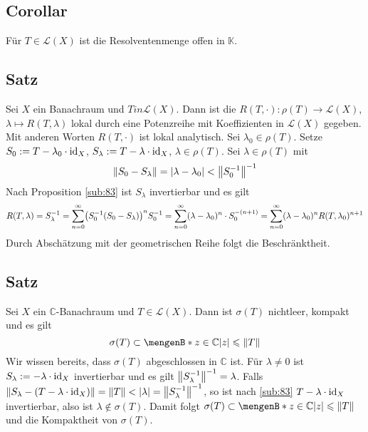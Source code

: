 \subsection{Corollar} %
\label{sub:84}
Für $T \in \mathcal{L}(X)$ ist die Resolventenmenge offen in $\mathds{K}$.

\subsection[Satz: Die Resolventenabbildung ist lokal durch eine Potenzreihe gegeben]{Satz} %
\label{sub:85}
Sei $X$ ein Banachraum und $T in \mathcal{L}(X)$. Dann ist die  $R(T,\cdot ) \colon \rho(T) \to \mathcal{L}(X)$, $\lambda \mapsto R(T,\lambda)$
lokal durch eine Potenzreihe mit Koeffizienten in $\mathcal{L}(X)$ gegeben. Mit anderen Worten $R(T,\cdot )$ ist lokal analytisch.
Sei $\lambda_0 \in \rho(T)$. Setze $S_0 := T- \lambda_0 \cdot \operatorname{id}_X$, $S_\lambda := T- \lambda \cdot \operatorname{id}_X$, $\lambda \in \rho(T)$. Sei $\lambda \in \rho(T)$ mit 
\[
	\norm{S_0 - S_\lambda} = \abs*{\lambda-\lambda_0}< \norm{S_0 ^{-1}} ^{-1}
\]
Nach Proposition \ref{sub:83} ist $S_\lambda$ invertierbar und es gilt 
\[
	R(T,\lambda) = S_\lambda ^{-1} = \sum_{n=0}^{\infty} \enbrace*{S_0^{-1} (S_0-S_\lambda)}^n S_0^{-1} = \sum_{n=0}^{\infty} (\lambda-\lambda_0)^n \cdot S_0^{-(n+1)}
	= \sum_{n=0}^{\infty} (\lambda-\lambda_0)^n R(T,\lambda_0)^{n+1}
\]
Durch Abschätzung mit der geometrischen Reihe folgt die Beschränktheit. \bewende

\subsection{Satz} %
\label{sub:86}
Sei $X$ ein $\mathds{C}$-Banachraum und $T \in \mathcal{L}(X)$. Dann ist $\sigma(T)$ nichtleer, kompakt und es gilt 
\[
	\sigma(T) \subset \set[z \in \mathds{C}]{\abs*{z} \le \norm{T}} 
\]
Wir wissen bereits, dass $\sigma(T)$ abgeschlossen in $\mathds{C}$ ist. Für $\lambda\not=0$ ist $S_\lambda := -\lambda \cdot \operatorname{id}_X$ invertierbar und es gilt
$\cramped{\norm{S_\lambda ^{-1}}^{-1} =\lambda}$. Falls $\cramped{\norm{S_\lambda - (T-\lambda \cdot \id_X)}=\norm{T} < \abs*{\lambda}= \norm{S_\lambda ^{-1}} ^{-1}}$, so 
ist nach \ref{sub:83} $T- \lambda \cdot \operatorname{id}_X$ invertierbar, also ist $\lambda \not\in \sigma(T)$. Damit folgt 
$\sigma(T) \subset \set[z \in \mathds{C}]{\abs*{z}\le \norm{T}}$ und die Kompaktheit von $\sigma(T)$.

